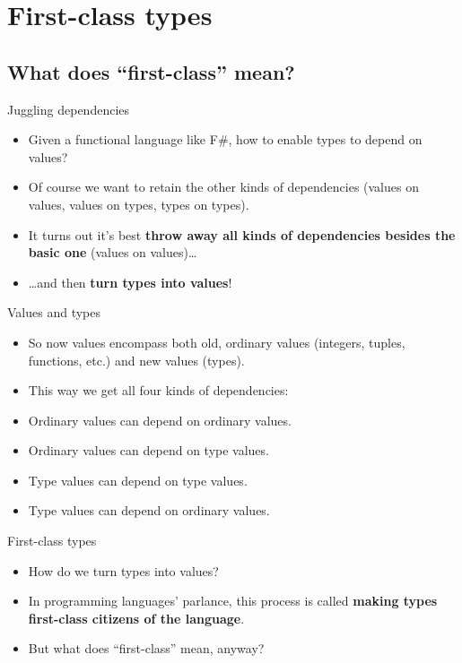 \documentclass{beamer}
\begin{document}
\section{First-class types}

\subsection{What does ``first-class'' mean?}

\begin{frame}{Juggling dependencies}
\begin{itemize}
	\item Given a functional language like F\#, how to enable types to depend on values?
	\item Of course we want to retain the other kinds of dependencies (values on values, values on types, types on types).
	\item It turns out it's best \textbf{throw away all kinds of dependencies besides the basic one} (values on values)\dots
	\item \dots and then \textbf{turn types into values}!
\end{itemize}
\end{frame}

\begin{frame}{Values and types}
\begin{itemize}
	\item So now values encompass both old, ordinary values (integers, tuples, functions, etc.) and new values (types).
	\item This way we get all four kinds of dependencies:
	\item Ordinary values can depend on ordinary values.
	\item Ordinary values can depend on type values.
	\item Type values can depend on type values.
	\item Type values can depend on ordinary values.
\end{itemize}
\end{frame}

\begin{frame}{First-class types}
\begin{itemize}
	\item How do we turn types into values?
	\item In programming languages' parlance, this process is called \textbf{making types first-class citizens of the language}.
	\item But what does ``first-class'' mean, anyway?
\end{itemize}
\end{frame}
\end{document}
